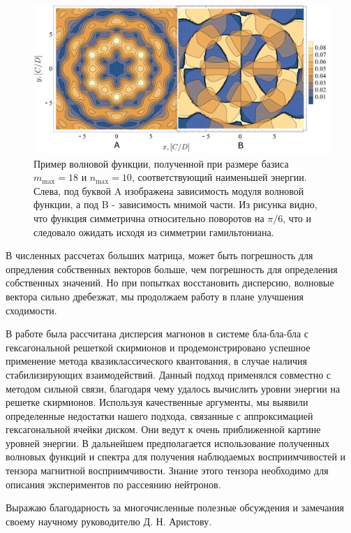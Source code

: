 \documentclass[a4paper,article,14pt]{extarticle}
\begin{document}
\begin{figure}[t]
\centering	
\includegraphics[width=1.05\columnwidth]{images/eigenfunc.pdf}
\caption{Пример волновой функции, полученной при размере базиса $m_\text{max}=18$ и $n_\text{max}=10$, соответствующий наименьшей энергии. Слева, под буквой A изображена зависимость модуля волновой функции, а под B - зависимость мнимой части. Из рисунка видно, что функция симметрична относительно поворотов на $\pi/6$, что и следовало ожидать исходя из симметрии гамильтониана. }
\label{fig:landau_eigenfunction}
\end{figure}


\pagebreak
{}
В численных рассчетах больших матрица, может быть погрешность для опредления собственных векторов больше, чем погрешность для определения собственных значений. Но при попытках восстановить дисперсию, волновые вектора сильно дребезжат, мы продолжаем работу в плане улучшения сходимости.

\pagebreak
{}

В работе была рассчитана дисперсия магнонов в системе бла-бла-бла с гексагональной решеткой скирмионов и продемонстрировано успешное применение метода квазиклассического квантования, в случае наличия стабилизирующих взаимодействий. Данный подход применялся совместно с методом сильной связи, благодаря чему удалось вычислить уровни энергии на решетке скирмионов. Используя качественные аргументы, мы выявили определенные недостатки нашего подхода, связанные с аппроксимацией гексагональной ячейки диском. Они ведут к очень приближенной картине уровней энергии. В дальнейшем предполагается использование полученных волновых функций и спектра для получения наблюдаемых восприимчивостей и тензора магнитной восприимчивости. Знание этого тензора необходимо для описания экспериментов по рассеянию нейтронов.

Выражаю благодарность за многочисленные полезные обсуждения и замечания своему научному руководителю Д. Н. Аристову.
\end{document}

